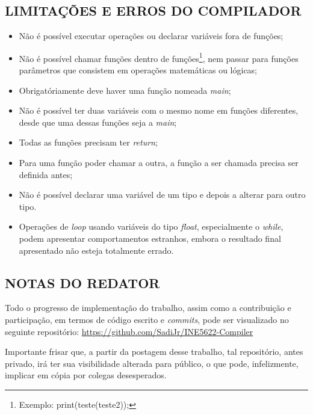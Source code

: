 	\subsection{\normalsize LIMITAÇÕES E ERROS DO COMPILADOR}
	\begin{itemize}
		\item Não é possível executar operações ou declarar variáveis fora de funções;
		\item Não é possível chamar funções dentro de funções\footnote{Exemplo: print(teste(teste2));}, nem passar para funções parâmetros que consistem em operações matemáticas ou lógicas;
		\item Obrigatóriamente deve haver uma função nomeada \textit{main};
		\item Não é possível ter duas variáveis com o mesmo nome em funções diferentes, desde que uma dessas funções seja a \textit{main};
		\item Todas as funções precisam ter \textit{return};
		\item Para uma função poder chamar a outra, a função a ser chamada precisa ser definida antes;
		\item Não é possível declarar uma variável de um tipo e depois a alterar para outro tipo.
		\item Operações de \textit{loop} usando variáveis do tipo \textit{float}, especialmente o \textit{while}, podem apresentar comportamentos estranhos, embora o resultado final apresentado não esteja totalmente errado.
	\end{itemize}
	
	\subsection{\normalsize NOTAS DO REDATOR}
	Todo o progresso de implementação do trabalho, assim como a contribuição e participação, em termos de código escrito e \textit{commits}, pode ser visualizado no seguinte repositório: \url{https://github.com/SadiJr/INE5622-Compiler}

	Importante frisar que, a partir da postagem desse trabalho, tal repositório, antes privado, irá ter sua visibilidade alterada para público, o que pode, infelizmente, implicar em cópia por colegas desesperados.